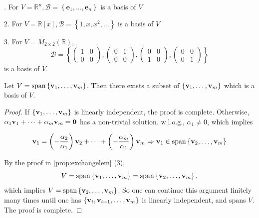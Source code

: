 \begin{example} 
. For \(V = {\mathbb{R}}^n,\mathcal B = \left\{  {{\mathbf{e}}_1,\ldots ,{\mathbf{e}}_n}\right\}\) is a basis of \(V\)

2. For \(V = \mathbb{R}\left\lbrack  x\right\rbrack  ,\mathcal B = \left\{  {1,x,{x}^2,\ldots }\right\}\) is a basis of \(V\)

3. For \(V = {M}_{2 \times  2}\left( \mathbb{R}\right)\),
\[
\mathcal B = \left\{  {\left( \begin{array}{ll} 1 & 0 \\  0 & 0 \end{array}\right) ,\left( \begin{array}{ll} 0 & 1 \\  0 & 0 \end{array}\right) ,\left( \begin{array}{ll} 0 & 0 \\  1 & 0 \end{array}\right) ,\left( \begin{array}{ll} 0 & 0 \\  0 & 1 \end{array}\right) }\right\}
\]
is a basis of \(V\).
\end{example}

\begin{proposition} Let \(V = \operatorname{span}\left\{  {{\bf v}_1,\ldots ,{\bf v}_{m}}\right\}\). Then there exists a subset of \(\left\{  {{\bf v}_1,\ldots ,{\bf v}_{m}}\right\}\) which is a basis of \(V\).
\end{proposition}

\begin{proof} If \(\left\{  {{\bf v}_1,\ldots ,{\bf v}_{m}}\right\}\) is linearly independent, the proof is complete. Otherwise, \(\alpha_1{\bf v}_1 + \cdots  + \alpha_{m}{\bf v}_{m} = \mathbf{0}\) has a non-trivial solution. w.l.o.g., \(\alpha_1 \neq  0\), which implies

\[
{\bf v}_1 =  \left(- \frac{\alpha_2}{\alpha_1}\right){\bf v}_2 + \cdots  + \left(- \frac{\alpha_{m}}{\alpha_1}\right) {\bf v}_{m} \Rightarrow  {\bf v}_1 \in  \operatorname{span}\left\{  {{\bf v}_2,\ldots ,{\bf v}_{m}}\right\}
\]

By the proof in \autoref{prop:exchangelem} (3),
\[
V =\operatorname{span}\left\{  {{\bf v}_1,\ldots ,{\bf v}_{m}}\right\}   = \operatorname{span}\left\{  {{\bf v}_2,\ldots ,{\bf v}_{m}}\right\}  ,
\]
which implies \(V = \operatorname{span}\left\{  {{\bf v}_2,\ldots ,{\bf v}_{m}}\right\}\).
So one can continue this argument finitely many times until one has \(\left\{  {{\bf v}_{i},{\bf v}_{i + 1},\ldots ,{\bf v}_{m}}\right\}\) is linearly independent, and spans \(V\). The proof is complete.
\end{proof}


